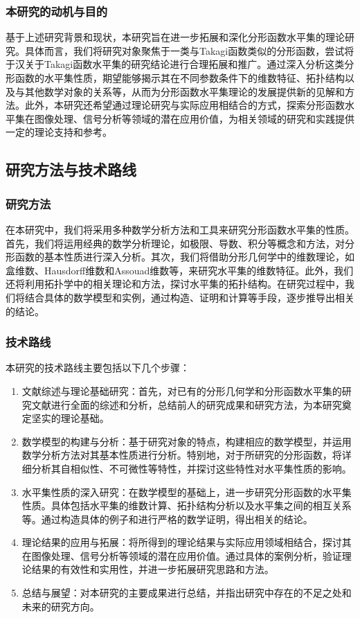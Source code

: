 \subsubsection{本研究的动机与目的}

基于上述研究背景和现状，本研究旨在进一步拓展和深化分形函数水平集的理论研究。具体而言，我们将研究对象聚焦于一类与Takagi函数类似的分形函数，尝试将于汉关于Takagi函数水平集的研究结论进行合理拓展和推广。通过深入分析这类分形函数的水平集性质，期望能够揭示其在不同参数条件下的维数特征、拓扑结构以及与其他数学对象的关系等，从而为分形函数水平集理论的发展提供新的见解和方法。此外，本研究还希望通过理论研究与实际应用相结合的方式，探索分形函数水平集在图像处理、信号分析等领域的潜在应用价值，为相关领域的研究和实践提供一定的理论支持和参考。

\subsection{研究方法与技术路线}

\subsubsection{研究方法}

在本研究中，我们将采用多种数学分析方法和工具来研究分形函数水平集的性质。首先，我们将运用经典的数学分析理论，如极限、导数、积分等概念和方法，对分形函数的基本性质进行深入分析。其次，我们将借助分形几何学中的维数理论，如盒维数、Hausdorff维数和Assouad维数等，来研究水平集的维数特征。此外，我们还将利用拓扑学中的相关理论和方法，探讨水平集的拓扑结构。在研究过程中，我们将结合具体的数学模型和实例，通过构造、证明和计算等手段，逐步推导出相关的结论。

\subsubsection{技术路线}

本研究的技术路线主要包括以下几个步骤：

\begin{enumerate}
      \item 文献综述与理论基础研究：首先，对已有的分形几何学和分形函数水平集的研究文献进行全面的综述和分析，总结前人的研究成果和研究方法，为本研究奠定坚实的理论基础。
      \item 数学模型的构建与分析：基于研究对象的特点，构建相应的数学模型，并运用数学分析方法对其基本性质进行分析。特别地，对于所研究的分形函数，将详细分析其自相似性、不可微性等特性，并探讨这些特性对水平集性质的影响。
      \item 水平集性质的深入研究：在数学模型的基础上，进一步研究分形函数的水平集性质。具体包括水平集的维数计算、拓扑结构分析以及水平集之间的相互关系等。通过构造具体的例子和进行严格的数学证明，得出相关的结论。
      \item 理论结果的应用与拓展：将所得到的理论结果与实际应用领域相结合，探讨其在图像处理、信号分析等领域的潜在应用价值。通过具体的案例分析，验证理论结果的有效性和实用性，并进一步拓展研究思路和方法。
      \item 总结与展望：对本研究的主要成果进行总结，并指出研究中存在的不足之处和未来的研究方向。
\end{enumerate}


